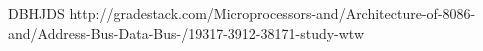 \newpage
{}
    \begin{thebibliography}{9}

     DBHJDS
    http://gradestack.com/Microprocessors-and/Architecture-of-8086-and/Address-Bus-Data-Bus-/19317-3912-38171-study-wtw

    \end{thebibliography}
